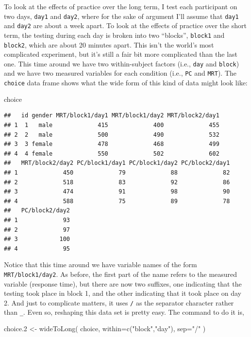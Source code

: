 \documentclass[
]{book}
\newenvironment{Shaded}{\begin{snugshade}}{\end{snugshade}}
\newcommand{\AttributeTok}[1]{\textcolor[rgb]{0.77,0.63,0.00}{#1}}
\newcommand{\FloatTok}[1]{\textcolor[rgb]{0.00,0.00,0.81}{#1}}
\newcommand{\FunctionTok}[1]{\textcolor[rgb]{0.00,0.00,0.00}{#1}}
\newcommand{\NormalTok}[1]{#1}
\newcommand{\OtherTok}[1]{\textcolor[rgb]{0.56,0.35,0.01}{#1}}
\newcommand{\StringTok}[1]{\textcolor[rgb]{0.31,0.60,0.02}{#1}}
\begin{document}
To look at the effects of practice over the long term, I test each participant on two days, \texttt{day1} and \texttt{day2}, where for the sake of argument I'll assume that \texttt{day1} and \texttt{day2} are about a week apart. To look at the effects of practice over the short term, the testing during each day is broken into two ``blocks'', \texttt{block1} and \texttt{block2}, which are about 20 minutes apart. This isn't the world's most complicated experiment, but it's still a fair bit more complicated than the last one. This time around we have two within-subject factors (i.e., \texttt{day} and \texttt{block}) and we have two measured variables for each condition (i.e., \texttt{PC} and \texttt{MRT}). The \texttt{choice} data frame shows what the wide form of this kind of data might look like:

\begin{Shaded}
\begin{Highlighting}[]
\NormalTok{choice}
\end{Highlighting}
\end{Shaded}

\begin{verbatim}
##   id gender MRT/block1/day1 MRT/block1/day2 MRT/block2/day1
## 1  1   male             415             400             455
## 2  2   male             500             490             532
## 3  3 female             478             468             499
## 4  4 female             550             502             602
##   MRT/block2/day2 PC/block1/day1 PC/block1/day2 PC/block2/day1
## 1             450             79             88             82
## 2             518             83             92             86
## 3             474             91             98             90
## 4             588             75             89             78
##   PC/block2/day2
## 1             93
## 2             97
## 3            100
## 4             95
\end{verbatim}

Notice that this time around we have variable names of the form \texttt{MRT/block1/day2}. As before, the first part of the name refers to the measured variable (response time), but there are now two suffixes, one indicating that the testing took place in block 1, and the other indicating that it took place on day 2. And just to complicate matters, it uses \texttt{/} as the separator character rather than \texttt{\_}. Even so, reshaping this data set is pretty easy. The command to do it is,

\begin{Shaded}
\begin{Highlighting}[]
\NormalTok{choice}\FloatTok{.2} \OtherTok{\textless{}{-}} \FunctionTok{wideToLong}\NormalTok{( choice, }\AttributeTok{within=}\FunctionTok{c}\NormalTok{(}\StringTok{"block"}\NormalTok{,}\StringTok{"day"}\NormalTok{), }\AttributeTok{sep=}\StringTok{"/"}\NormalTok{ )}
\end{Highlighting}
\end{Shaded}
\end{document}
